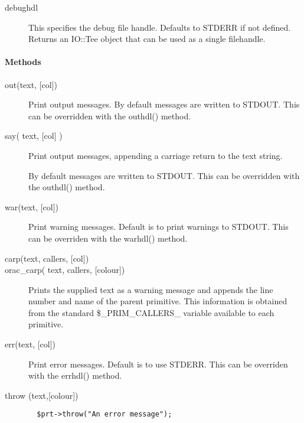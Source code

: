 \begin{description}
\begin{description}
\item[{debughdl}] \mbox{}

This specifies the debug file handle. Defaults to STDERR if not 
defined. Returns an IO::Tee object that can be used as a single
filehandle.

\end{description}
\paragraph*{Methods\label{ORAC::Print_Methods}}
\begin{description}

\item[{out(text, [col])}] \mbox{}

Print output messages.
By default messages are written to STDOUT. This can be overridden with
the outhdl() method.


\item[{say( text, [col] )}] \mbox{}

Print output messages, appending a carriage return to the text string.



By default messages are written to STDOUT. This can be overridden with the outhdl() method.


\item[{war(text, [col])}] \mbox{}

Print warning messages.
Default is to print warnings to STDOUT. This can be overriden with
the warhdl() method.


\item[{carp(text, callers, [col])}] \mbox{}
\item[{orac\_carp( text, callers, [colour])}] \mbox{}

Prints the supplied text as a warning message and appends the line number
and name of the parent primitive. This information is obtained from the
standard \$\_PRIM\_CALLERS\_ variable available to each primitive.


\item[{err(text, [col])}] \mbox{}

Print error messages.
Default is to use STDERR. This can be overriden with the errhdl()
method.


\item[{throw (text,[colour])}] \mbox{}\begin{verbatim}
  $prt->throw("An error message");
\end{verbatim}



\end{description}
\end{description}
